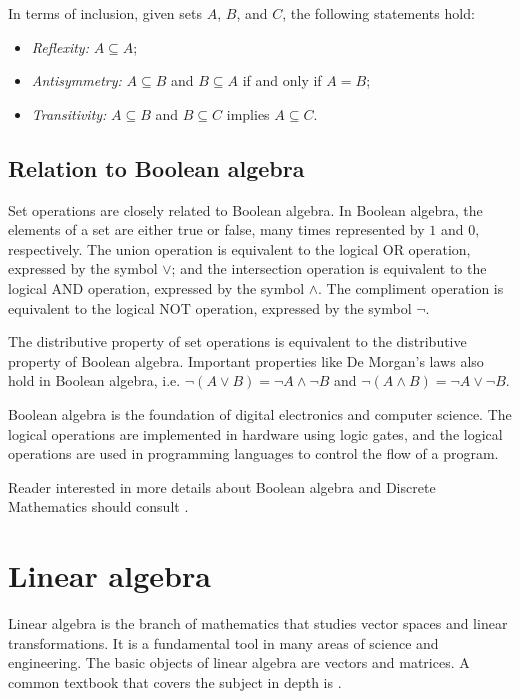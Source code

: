 In terms of inclusion, given sets $A$, $B$, and $C$, the following statements hold:
\begin{itemize}
  \item \emph{Reflexity:} $A \subseteq A$;
  \item \emph{Antisymmetry:} $A \subseteq B$ and $B \subseteq A$ if and only if $A = B$;
  \item \emph{Transitivity:} $A \subseteq B$ and $B \subseteq C$ implies $A \subseteq C$.
\end{itemize}

\subsection{Relation to Boolean algebra}

Set operations are closely related to Boolean algebra.  In Boolean algebra, the elements
of a set are either true or false, many times represented by $1$ and $0$, respectively.
The union operation is equivalent to the logical OR operation, expressed by the symbol
$\lor$; and the intersection operation is equivalent to the logical AND operation,
expressed by the symbol $\land$.  The compliment operation is equivalent to the logical
NOT operation, expressed by the symbol $\lnot$.

The distributive property of set operations is equivalent to the distributive property of
Boolean algebra.  Important properties like De Morgan's laws also hold in Boolean algebra,
i.e. $\lnot (A \lor B) = \lnot A \land \lnot B$ and $\lnot (A \land B) = \lnot A \lor
\lnot B$.

Boolean algebra is the foundation of digital electronics and computer science.  The
logical operations are implemented in hardware using logic gates, and the logical
operations are used in programming languages to control the flow of a program.

Reader interested in more details about Boolean algebra and Discrete Mathematics
should consult \textcite{Rosen2018}.

\section{Linear algebra}

Linear algebra is the branch of mathematics that studies vector spaces and linear
transformations.  It is a fundamental tool in many areas of science and engineering.
The basic objects of linear algebra are vectors and matrices.  A common textbook that
covers the subject in depth is \textcite{Strang2023}.

